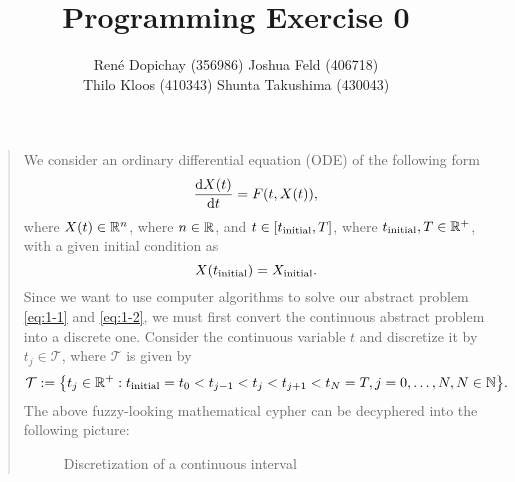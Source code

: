 \documentclass[english]{exercise}
\title{Programming Exercise 0}
\author{René Dopichay (356986) \quad Joshua Feld (406718)\\Thilo Kloos (410343) \quad Shunta Takushima (430043)}
\begin{document}
	\maketitle


	\section{}

	\begin{quote}
		We consider an ordinary differential equation (ODE) of the following form
		\begin{equation}\label{eq:1-1}
			\frac{\d X\parentheses*{t}}{\d t} = F\parentheses*{t, X\parentheses*{t}},
		\end{equation}
		where \(X\parentheses*{t} \in \R^n\), where \(n \in \R\), and \(t \in \brackets*{t_{\text{initial}}, T}\), where \(t_{\text{initial}}, T \in \R^+\), with a given initial condition as
		\begin{equation}\label{eq:1-2}
			X\parentheses*{t_{\text{initial}}} = X_{\text{initial}}.
		\end{equation}
		Since we want to use computer algorithms to solve our abstract problem \eqref{eq:1-1} and \eqref{eq:1-2}, we must first convert the continuous abstract problem into a discrete one.
		Consider the continuous variable \(t\) and discretize it by \(t_j \in \mathcal{T}\), where \(\mathcal{T}\) is given by
		\begin{equation}
			\mathcal{T} := \braces*{t_j \in \R^+ : t_{\text{initial}} = t_0 < t_{j - 1} < t_j < t_{j + 1} < t_N = T, j = 0, \ldots, N, N \in \N}.
		\end{equation}
		The above fuzzy-looking mathematical cypher can be decyphered into the following picture:
		\begin{figure}[h]
			\centering
			\caption{Discretization of a continuous interval}
			\label{fig:1-1}
		\end{figure}


\end{quote}
\end{document}
